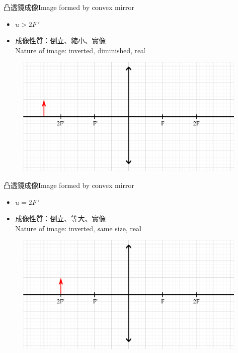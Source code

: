 \documentclass[beamer=true]{standalone}
\begin{document}
\begin{frame}{凸透鏡成像Image formed by convex mirror}
    \begin{itemize}
        \item $u>2F\,'$
        \item 成像性質：倒立、縮小、實像
              \\Nature of image: inverted, diminished, real
    \end{itemize}
    \begin{figure}
        \centering
        \includegraphics[width=1\linewidth]{assets/dqw0md9wdi.png}


    \end{figure}
\end{frame}

\begin{frame}{凸透鏡成像Image formed by convex mirror}
    \begin{itemize}
        \item $u=2F\,'$
        \item 成像性質：倒立、等大、實像
              \\Nature of image: inverted, same size, real
    \end{itemize}
    \begin{figure}
        \centering
        \includegraphics[width=1\linewidth]{assets/d8q9nwd8qwub8dnwq.png}


    \end{figure}
\end{frame}
\end{document}
